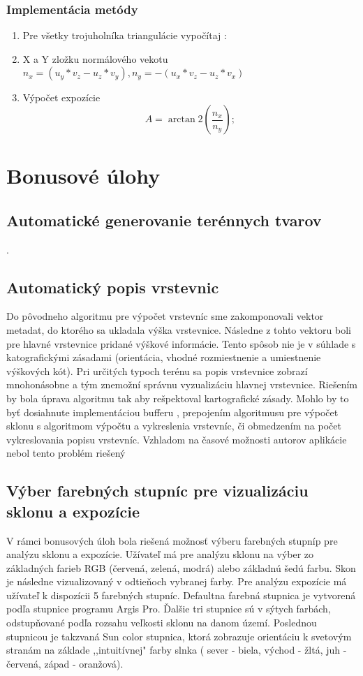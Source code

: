 \documentclass[12pt]{article}
\begin{document}
\subsubsection{Implementácia metódy}
\begin{enumerate}
	\item Pre všetky trojuholníka triangulácie vypočítaj : 
	\item X a Y zložku normálového vekotu $ n_x = (u_y * v_z - u_z * v_y) , n_y = - (u_x * v_z - u_z * v_x) $
	\item Výpočet expozície $$A = \arctan2(\frac{n_x}{n_y});$$

\end{enumerate}

\clearpage 
\section{Bonusové úlohy}

\subsection {Automatické generovanie terénnych tvarov }
.

\subsection{Automatický popis vrstevnic}
Do pôvodneho algoritmu pre výpočet vrstevníc sme zakomponovali vektor metadat, do ktorého sa ukladala výška vrstevnice. Následne z tohto vektoru boli pre hlavné vrstevnice pridané výškové informácie. Tento spôsob nie je v súhlade s katografickými zásadami (orientácia, vhodné rozmiestnenie a umiestnenie výškových kót). Pri určitých typoch terénu sa popis vrstevnice zobrazí mnohonásobne a tým znemožní správnu vyzualizáciu hlavnej vrstevnice. Riešením by bola úprava algoritmu tak aby rešpektoval kartografické zásady. Mohlo by to byť dosiahnute implementáciou bufferu , prepojením algoritmusu pre výpočet sklonu s algoritmom výpočtu a vykreslenia vrstevníc, či obmedzením na počet vykreslovania popisu vrstevníc. Vzhladom na časové možnosti autorov aplikácie nebol tento problém riešený

\subsection{Výber farebných stupníc pre vizualizáciu sklonu a expozície}
V rámci bonusových úloh bola riešená možnosť výberu farebných stupníp pre analýzu sklonu a expozície. Užívateľ má pre analýzu sklonu na výber zo základných farieb RGB (červená, zelená, modrá) alebo základnú šedú farbu. Skon je následne vizualizovaný v odtieňoch vybranej farby. Pre analýzu expozície má užívateľ k dispozícii 5 farebných stupníc. Defaultna farebná stupnica je vytvorená podľa stupnice programu Argis Pro. Ďalšie tri stupnice sú v sýtych farbách, odstupňované podľa rozsahu veľkosti sklonu na danom území. Poslednou stupnicou je takzvaná Sun color stupnica, ktorá zobrazuje orientáciu k svetovým stranám na základe  ,,intuitívnej" farby slnka ( sever - biela, východ - žltá, juh - červená, západ - oranžová).
\end{document}
